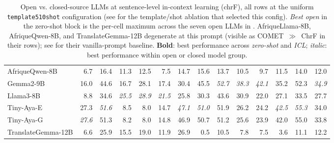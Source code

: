 \begin{table}[t]
\begin{tabular}{lrrrrrrrrrrrrr}
AfriqueQwen-8B & 6.7 & 16.4 & 11.3 & 12.5 & 7.5 & 14.7 & 15.6 & 13.7 & 10.5 & 9.7 & 11.5 & 14.0 & 12.0 \\
Gemma2-9B & 16.0 & 44.6 & 16.7 & 28.1 & 17.4 & 30.4 & 45.5 & \emph{52.7} & \emph{38.3} & \emph{42.1} & 35.2 & 52.3 & \emph{34.9} \\
Llama3-8B & 8.8 & 34.6 & \emph{25.5} & \emph{28.9} & \emph{21.5} & 25.8 & 30.3 & 43.6 & 30.9 & 22.0 & 27.1 & 33.5 & 27.7 \\
Tiny-Aya-E & 27.3 & \emph{51.6} & 8.5 & 8.0 & 14.7 & \emph{47.1} & \emph{51.0} & 51.9 & 26.2 & 24.2 & \emph{42.5} & \emph{55.3} & 34.0 \\
Tiny-Aya-G & \emph{27.6} & 51.3 & 8.2 & 8.0 & 14.8 & 46.9 & 50.7 & 51.2 & 25.6 & 23.9 & 42.0 & 55.0 & 33.8 \\
TranslateGemma-12B & 6.6 & 25.9 & 15.5 & 19.0 & 11.9 & 26.9 & 0.5 & 10.5 & 7.8 & 7.5 & 3.6 & 11.1 & 12.2 \\
\bottomrule
\end{tabular}
\caption{Open vs. closed-source LLMs at sentence-level in-context learning (chrF), all rows at the uniform \texttt{template5\textunderscore{}10shot} configuration (see  for the template/shot ablation that selected this config). \textit{Best open} in the zero-shot block is the per-cell maximum across the seven open LLMs in . AfriqueLlama-8B, AfriqueQwen-8B, and TranslateGemma-12B degenerate at this prompt (visible as COMET~$\gg$~ChrF in their rows); see  for their vanilla-prompt baseline. \textbf{Bold}: best performance across \textit{zero-shot} and \textit{ICL}; \emph{italic}: best performance within open or closed model group.}
\label{tab:open_vs_closed_icl_chrf}
\end{table}

